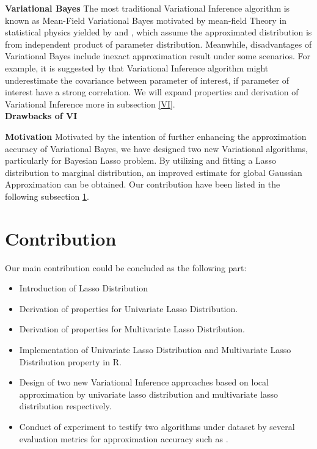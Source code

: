 \textbf{Variational Bayes}
The most traditional Variational Inference algorithm is known as Mean-Field Variational Bayes motivated by mean-field Theory in statistical physics yielded by 
\cite{jordan_ghahramani_jaakkola_saul_1998} and \cite{attias_1999}, which assume the approximated distribution is from independent product of parameter distribution.
Meanwhile, disadvantages of Variational Bayes include inexact approximation result under some scenarios. For example, it is suggested by \cite{bishop_2006} 
 that Variational Inference algorithm might underestimate the covariance between parameter of interest, if parameter of interest have a strong correlation. We will expand properties and derivation of Variational Inference more in subsection \ref{VI}.\\

\textbf{Drawbacks of VI}



\textbf{Motivation}
Motivated by the intention of further enhancing the approximation accuracy of Variational Bayes, we have designed two new Variational algorithms, particularly for Bayesian Lasso problem. By utilizing and fitting a Lasso distribution to marginal distribution, an improved estimate for global Gaussian Approximation can be obtained. Our contribution have been listed in the following subsection \ref{cont}.\\



\section{Contribution}
\label{cont}
Our main contribution could be concluded as the following part:
\begin{itemize}
	\item Introduction of Lasso Distribution
	\item Derivation of properties for Univariate Lasso Distribution.
	\item Derivation of properties for Multivariate Lasso Distribution.
	\item Implementation of Univariate Lasso Distribution and Multivariate Lasso Distribution property in R.
	\item Design of two new Variational Inference approaches based on local approximation by univariate lasso distribution and multivariate lasso distribution respectively.
	\item Conduct of experiment to testify two algorithms under  dataset by several evaluation metrics for approximation accuracy such as .
\end{itemize}




